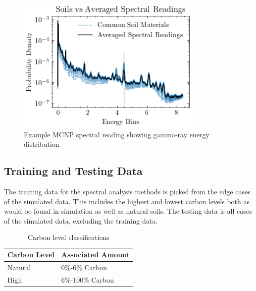 \documentclass[review]{elsarticle}
\begin{document}
\begin{figure}[H]
\centering
\includegraphics[width=0.8\textwidth]{../Figures/DataGeneration/MCNPSpectralReading.png}
\caption{Example MCNP spectral reading showing gamma-ray energy distribution}
\label{fig:mcnp_spectral}
\end{figure}

\subsection{Training and Testing Data}

The training data for the spectral analysis methods is picked from the edge cases of the simulated data. This includes the highest and lowest carbon levels both as would be found in simulation as well as natural soils. The testing data is all cases of the simulated data, excluding the training data.

\begin{table}[H]
\centering
\caption{Carbon level classifications}
\label{tab:carbon_levels}
\begin{tabular}{ll}
\toprule
Carbon Level & Associated Amount \\
\midrule
Natural & 0\%-6\% Carbon \\
High & 6\%-100\% Carbon \\
\bottomrule
\end{tabular}
\end{table}
\end{document}
